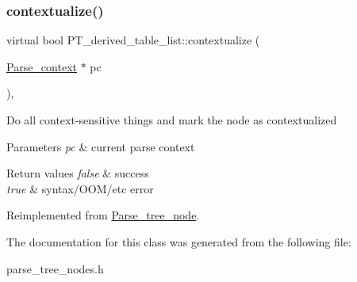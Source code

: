 \subsubsection{\texorpdfstring{contextualize()}{contextualize()}}
{\footnotesize\ttfamily virtual bool P\+T\+\_\+derived\+\_\+table\+\_\+list\+::contextualize (\begin{DoxyParamCaption}\item[{\mbox{\hyperlink{structParse__context}{Parse\+\_\+context}} $\ast$}]{pc }\end{DoxyParamCaption})\hspace{0.3cm}{\ttfamily [inline]}, {\ttfamily [virtual]}}

Do all context-\/sensitive things and mark the node as contextualized


\begin{DoxyParams}{Parameters}
{\em pc} & current parse context\\
\hline
\end{DoxyParams}

\begin{DoxyRetVals}{Return values}
{\em false} & success \\
\hline
{\em true} & syntax/\+O\+O\+M/etc error \\
\hline
\end{DoxyRetVals}


Reimplemented from \mbox{\hyperlink{classParse__tree__node_a22d93524a537d0df652d7efa144f23da}{Parse\+\_\+tree\+\_\+node}}.



The documentation for this class was generated from the following file\+:\begin{DoxyCompactItemize}
\item 
parse\+\_\+tree\+\_\+nodes.\+h\end{DoxyCompactItemize}

